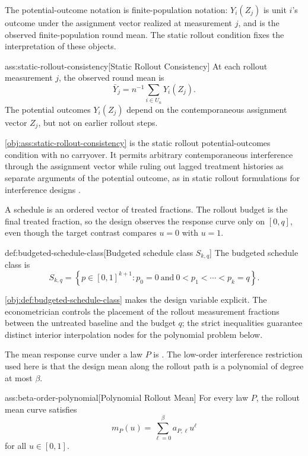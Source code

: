 \documentclass[11pt]{article}
\begin{document}
The potential-outcome notation is finite-population notation: \(Y_i(Z_j)\) is unit \(i\)'s outcome under the assignment vector realized at measurement \(j\), and  is the observed finite-population round mean. The static rollout condition fixes the interpretation of these objects.

\begin{assumptionv}{ass:static-rollout-consistency}[Static Rollout Consistency]
At each rollout measurement \(j\), the observed round mean is
\[
\bar Y_j
=
n^{-1}\sum_{i\in U_n} Y_i(Z_j).
\]
The potential outcomes \(Y_i(Z_j)\) depend on the contemporaneous assignment vector \(Z_j\), but not on earlier rollout steps.
\end{assumptionv}

\cref{obj:ass:static-rollout-consistency} is the static rollout potential-outcomes condition with no carryover. It permits arbitrary contemporaneous interference through the assignment vector while ruling out lagged treatment histories as separate arguments of the potential outcome, as in static rollout formulations for interference designs \citep{cortezrodriguez2024}.

A schedule is an ordered vector  of treated fractions. The rollout budget  is the final treated fraction, so the design observes the response curve only on \([0,q]\), even though the target contrast compares \(u=0\) with \(u=1\).

\begin{definitionv}{def:budgeted-schedule-class}[Budgeted schedule class \(S_{k,q}\)]
The budgeted schedule class is
\[
S_{k,q}
=
\left\{
p\in[0,1]^{k+1}:
p_0=0
\ \text{and}\
0<p_1<\cdots<p_k=q
\right\}.
\]
\end{definitionv}

\cref{obj:def:budgeted-schedule-class} makes the design variable explicit. The econometrician controls the placement of the rollout measurement fractions between the untreated baseline and the budget \(q\); the strict inequalities guarantee distinct interior interpolation nodes for the polynomial problem below.

The mean response curve under a law \(P\) is . The low-order interference restriction used here is that the design mean along the rollout path is a polynomial of degree at most \(\beta\).

\begin{assumptionv}{ass:beta-order-polynomial}[Polynomial Rollout Mean]
For every law \(P\), the rollout mean curve satisfies
\[
m_P(u)=\sum_{\ell=0}^{\beta} a_{P,\ell}u^\ell
\]
for all \(u\in[0,1]\).
\end{assumptionv}
\end{document}
